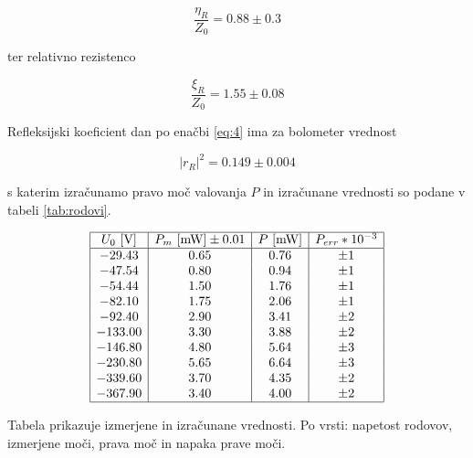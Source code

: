 \documentclass[11pt]{article}
\begin{document}
\[ \frac{\eta_R}{Z_0} = 0.88 \pm 0.3
\]

ter relativno rezistenco

\[ \frac{\xi_R}{Z_0} = 1.55 \pm 0.08
\]

Refleksijski koeficient dan po enačbi \ref{eq:4} ima za bolometer vrednost

\[ \left| r_R \right| ^2 = 0.149 \pm 0.004
\]

s katerim izračunamo pravo moč valovanja \(P\) in izračunane vrednosti
so podane v tabeli \ref{tab:rodovi}.

\begin{tabela}
  \centering
\[
  \begin{array}{|c|c|c|c|}\hline
    U_{0}\  [\mathrm{V}] & P_{m} \ [\mathrm{mW}] \pm 0.01 & P \ [\mathrm{mW}] & P_{err} * 10^{-3} \\ \hline
-29.43 & 0.65 & 0.76 & \pm 1 \\
-47.54 & 0.80 & 0.94 & \pm 1 \\
-54.44 & 1.50 & 1.76 & \pm 1 \\
-82.10 & 1.75 & 2.06 & \pm 1 \\
-92.40 & 2.90 & 3.41 & \pm 2 \\
-133.00 & 3.30 & 3.88 & \pm 2 \\
-146.80 & 4.80 & 5.64 & \pm 3 \\
-230.80 & 5.65 & 6.64 & \pm 3 \\
-339.60 & 3.70 & 4.35 & \pm 2 \\
-367.90 & 3.40 & 4.00 & \pm 2 \\\hline
    \end{array}
\]
\caption{\small Tabela prikazuje izmerjene in izračunane vrednosti. Po vrsti:
napetost rodovov, izmerjene moči, prava moč in napaka prave moči.}\label{tab:rodovi}
\end{tabela}

\nocite{*}
\printbibliography[heading=bibintoc]
\end{document}
